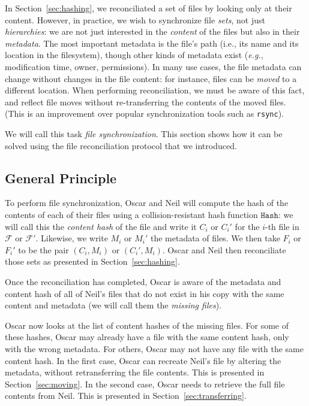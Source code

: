 \documentclass[twoside,envcountsame,runningheads]{llncs}
\newcommand{\Files}{\mathcal{F}}
\newcommand{\rsync}{\texttt{rsync}\xspace}
\newcommand{\eg}{\textit{e.g.}\xspace}
\newcommand{\Hash}{\ensuremath{\mathtt{Hash}}}
\begin{document}
In Section~\ref{sec:hashing}, we reconciliated a set of files by looking only at their content.
However, in practice, we wish to synchronize file \emph{sets}, not just
\emph{hierarchies}: we are not just interested in the \emph{content} of the
files but also in their \emph{metadata}. The most important metadata is the file's
path (i.e., its name and its location in the filesystem), though other kinds of
metadata exist (\eg, modification time, owner, permissions). In many use
cases, the file metadata can change without changes in the file content: for
instance, files can be \emph{moved} to a different location. When performing
reconciliation, we must be aware of this fact, and reflect file moves without
re-transferring the contents of the moved files. (This is an improvement over
popular synchronization tools such as \rsync).

We will call this task \emph{file synchronization}. This section shows how it can be solved using the file reconciliation protocol that we introduced.

\subsection{General Principle}

To perform file synchronization, Oscar and Neil will compute the hash of the
contents of each of their files using a collision-resistant hash function
$\Hash$: we will call this the \emph{content hash} of the file and write it
$C_i$ or $C_i'$ for the $i$-th file in $\Files$ or $\Files'$. Likewise, we
write $M_i$ or $M_i'$ the metadata of files. We then take $F_i$ or $F_i'$ to be
the pair $(C_i, M_i)$ or $(C_i', M_i)$. Oscar and Neil then reconciliate those
sets as presented in Section~\ref{sec:hashing}.

Once the reconciliation has completed, Oscar is aware of the metadata and
content hash of all of Neil's files that do not exist in his copy with the same
content and metadata (we will call them the \emph{missing files}).

Oscar now looks at the list of content hashes of the missing files. For some of
these hashes, Oscar may already have a file with the same content hash, only
with the wrong metadata. For others, Oscar may not have any file with the same
content hash. In the first case, Oscar can recreate Neil's file by altering the
metadata, without retransferring the file contents. This is presented in
Section~\ref{sec:moving}. In the second case, Oscar needs to retrieve the full
file contents from Neil. This is presented in Section~\ref{sec:transferring}.
\end{document}
